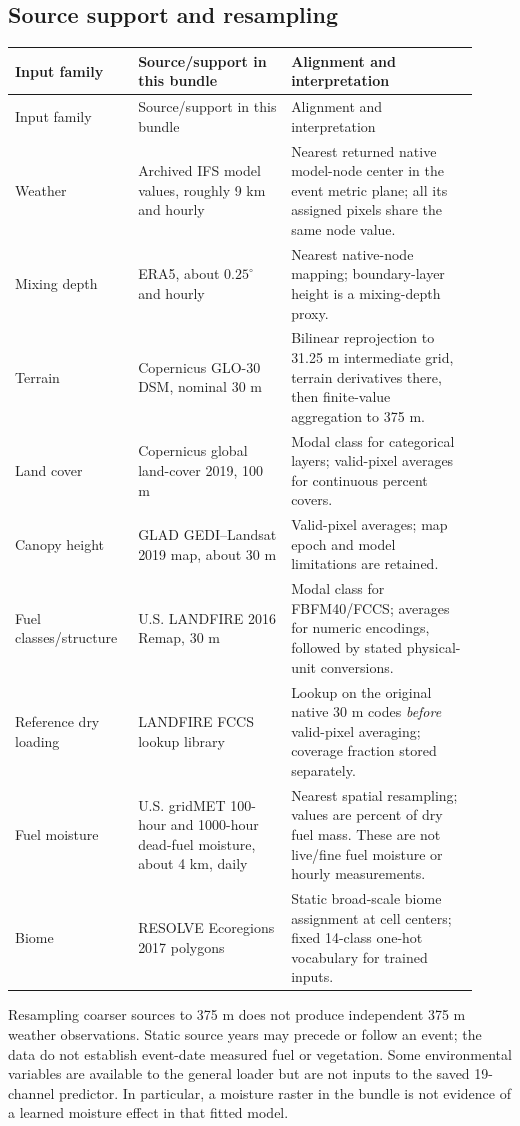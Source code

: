 \documentclass[11pt,a4paper]{article}
\begin{document}
\subsection{Source support and resampling}
\begin{longtable}{@{}P{0.23\linewidth}P{0.31\linewidth}P{0.38\linewidth}@{}}
\toprule Input family & Source/support in this bundle & Alignment and interpretation\\\midrule
\endfirsthead
\toprule Input family & Source/support in this bundle & Alignment and interpretation\\\midrule
\endhead
Weather & Archived IFS model values, roughly 9 km and hourly & Nearest returned native model-node center in the event metric plane; all its assigned pixels share the same node value.\\
Mixing depth & ERA5, about $0.25^\circ$ and hourly & Nearest native-node mapping; boundary-layer height is a mixing-depth proxy.\\
Terrain & Copernicus GLO-30 DSM, nominal 30 m & Bilinear reprojection to 31.25 m intermediate grid, terrain derivatives there, then finite-value aggregation to 375 m.\\
Land cover & Copernicus global land-cover 2019, 100 m & Modal class for categorical layers; valid-pixel averages for continuous percent covers.\\
Canopy height & GLAD GEDI--Landsat 2019 map, about 30 m & Valid-pixel averages; map epoch and model limitations are retained.\\
Fuel classes/structure & U.S. LANDFIRE 2016 Remap, 30 m & Modal class for FBFM40/FCCS; averages for numeric encodings, followed by stated physical-unit conversions.\\
Reference dry loading & LANDFIRE FCCS lookup library & Lookup on the original native 30 m codes \emph{before} valid-pixel averaging; coverage fraction stored separately.\\
Fuel moisture & U.S. gridMET 100-hour and 1000-hour dead-fuel moisture, about 4 km, daily & Nearest spatial resampling; values are percent of dry fuel mass. These are not live/fine fuel moisture or hourly measurements.\\
Biome & RESOLVE Ecoregions 2017 polygons & Static broad-scale biome assignment at cell centers; fixed 14-class one-hot vocabulary for trained inputs.\\
\bottomrule
\end{longtable}
Resampling coarser sources to 375 m does not produce independent 375 m weather
observations. Static source years may precede or follow an event; the data do
not establish event-date measured fuel or vegetation. Some environmental
variables are available to the general loader but are not inputs to the saved
19-channel predictor. In particular, a moisture raster in the bundle is not
evidence of a learned moisture effect in that fitted model.
\end{document}
